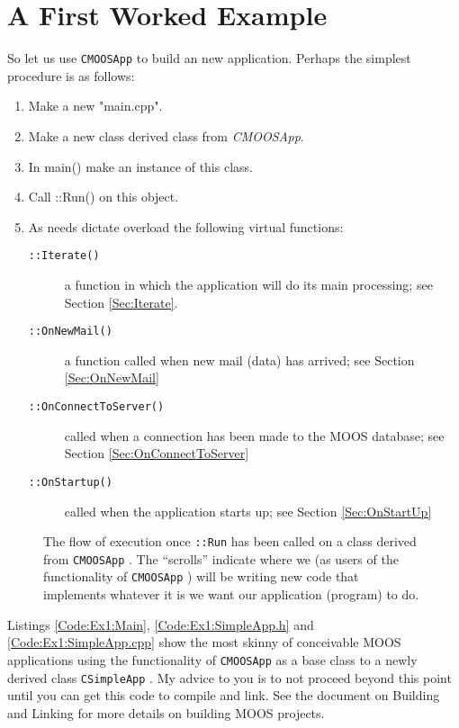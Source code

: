 \documentclass[a4paper,10pt]{article}
\newcommand{\Code}[1]{\texttt{#1} }
\newcommand{\code}[1]{\Code{#1} }
\begin{document}
\section{A First Worked Example}

So let us use \code{CMOOSApp} to build an new application. Perhaps
the simplest procedure  is as follows:

\begin{enumerate}
\item Make a new "main.cpp".
\item Make a new class derived  class from \textit{CMOOSApp}.
\item In main() make an instance of this class.
\item Call ::Run() on this object.
\item As needs dictate overload the following virtual functions:
    \begin{description}
    \item[\Code{::Iterate()}] a function in which the application will do its main processing; see Section \ref{Sec:Iterate}.
    \item[\Code{::OnNewMail()}] a function called when  new mail (data) has arrived; see Section \ref{Sec:OnNewMail}
    \item[\Code{::OnConnectToServer()}] called when a connection has been made to the MOOS database; see Section \ref{Sec:OnConnectToServer}
    \item[\Code{::OnStartup()}] called when the application starts up; see Section \ref{Sec:OnStartUp}
    \end{description}
\end{enumerate}

\begin{figure}[h!]
\centering {} \caption{The flow of execution once
\code{::Run} has been called on a class derived from
\code{CMOOSApp}. The ``scrolls'' indicate where we (as users of
the functionality of \code{CMOOSApp}) will be writing new code
that implements whatever it is we want our application (program)
to do. }\label{Fig:MOOSAppRun}
\end{figure}


Listings \ref{Code:Ex1:Main}, \ref{Code:Ex1:SimpleApp.h} and
\ref{Code:Ex1:SimpleApp.cpp} show the most skinny of conceivable
MOOS applications using the functionality of \code{CMOOSApp} as a
base class to a newly derived class \code{CSimpleApp}. My advice
to you is to not proceed beyond this point until you can get this
code to compile and link. See the document on Building and Linking
 for more details on building MOOS projects.
\end{document}
